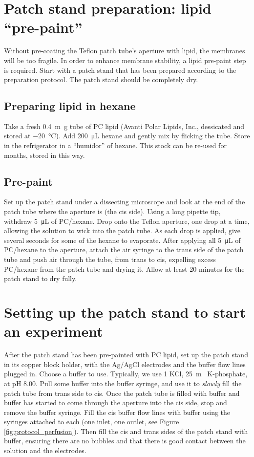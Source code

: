 \section{Patch stand preparation: lipid ``pre-paint”}

Without pre-coating the Teflon patch tube's aperture with lipid, the membranes will be too fragile.  In order to enhance membrane stability, a lipid pre-paint step is required.  Start with a patch stand that has been prepared according to the preparation protocol.  The patch stand should be completely dry.

\subsection{Preparing lipid in hexane}

Take a fresh \SI{0.4}{\m\g} tube of PC lipid (Avanti Polar Lipids, Inc., dessicated and stored at \SI{-20}{\celsius}).  Add \SI{200}{\micro\L} hexane and gently mix by flicking the tube.  Store in the refrigerator in a ``humidor” of hexane.  This stock can be re-used for months, stored in this way.

\subsection{Pre-paint}

Set up the patch stand under a dissecting microscope and look at the end of the patch tube where the aperture is (the cis side).  Using a long pipette tip, withdraw \SI{5}{\micro\L} of PC/hexane.  Drop onto the Teflon aperture, one drop at a time, allowing the solution to wick into the patch tube.  As each drop is applied, give several seconds for some of the hexane to evaporate.  After applying all \SI{5}{\micro\L} of PC/hexane to the aperture, attach the air syringe to the trans side of the patch tube and push air through the tube, from trans to cis, expelling excess PC/hexane from the patch tube and drying it.  Allow at least \num{20} minutes for the patch stand to dry fully.

\section{Setting up the patch stand to start an experiment}

After the patch stand has been pre-painted with PC lipid, set up the patch stand in its copper block holder, with the Ag/AgCl electrodes and the buffer flow lines plugged in.  Choose a buffer to use.  Typically, we use \SI{1}{\Molar} KCl, \SI{25}{\m\Molar} K-phosphate, at pH \num{8.00}.  Pull some buffer into the buffer syringe, and use it to \textit{slowly} fill the patch tube from trans side to cis.  Once the patch tube is filled with buffer and buffer has started to come through the aperture into the cis side, stop and remove the buffer syringe.  Fill the cis buffer flow lines with buffer using the syringes attached to each (one inlet, one outlet, see Figure \ref{fig:protocol_perfusion}).  Then fill the cis and trans sides of the patch stand with buffer, ensuring there are no bubbles and that there is good contact between the solution and the electrodes.

